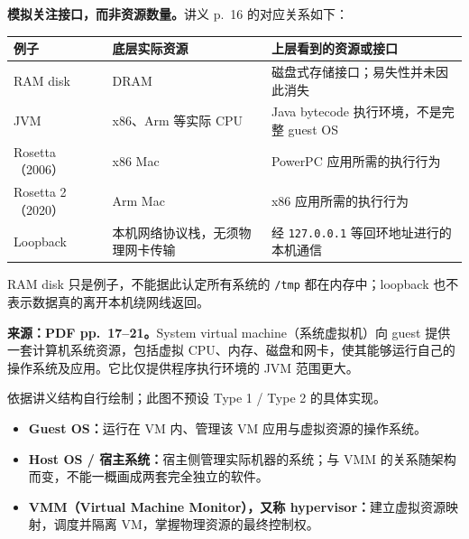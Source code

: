 \textbf{模拟关注接口，而非资源数量。}讲义 p.~16 的对应关系如下：
\begin{center}
\begin{tabularx}{\textwidth}{@{}lXX@{}}
\toprule
例子 & 底层实际资源 & 上层看到的资源或接口 \\
\midrule
RAM disk & DRAM & 磁盘式存储接口；易失性并未因此消失 \\
JVM & x86、Arm 等实际 CPU & Java bytecode 执行环境，不是完整 guest OS \\
Rosetta（2006） & x86 Mac & PowerPC 应用所需的执行行为 \\
Rosetta 2（2020） & Arm Mac & x86 应用所需的执行行为 \\
Loopback & 本机网络协议栈，无须物理网卡传输 & 经 \texttt{127.0.0.1} 等回环地址进行的本机通信 \\
\bottomrule
\end{tabularx}
\end{center}
RAM disk 只是例子，不能据此认定所有系统的 \texttt{/tmp} 都在内存中；loopback 也不表示数据真的离开本机绕网线返回。


\textbf{来源：PDF pp.~17--21。}System virtual machine（系统虚拟机）向 guest 提供一套计算机系统资源，包括虚拟 CPU、内存、磁盘和网卡，使其能够运行自己的操作系统及应用。它比仅提供程序执行环境的 JVM 范围更大。

\begin{center}
\par\small 依据讲义结构自行绘制；此图不预设 Type 1 / Type 2 的具体实现。
\end{center}

\begin{itemize}
  \item \textbf{Guest OS：}运行在 VM 内、管理该 VM 应用与虚拟资源的操作系统。
  \item \textbf{Host OS / 宿主系统：}宿主侧管理实际机器的系统；与 VMM 的关系随架构而变，不能一概画成两套完全独立的软件。
  \item \textbf{VMM（Virtual Machine Monitor），又称 hypervisor：}建立虚拟资源映射，调度并隔离 VM，掌握物理资源的最终控制权。
\end{itemize}

